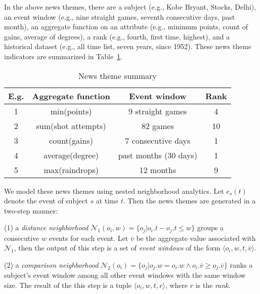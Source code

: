 In the above news themes, there are a subject (e.g., Kobe Bryant, Stocks, Delhi), an event window (e.g., nine straight games, seventh consecutive days, past month), an aggregate function on an attribute
(e.g., minimum points, count of gains, average of degrees), a rank (e.g., fourth, first time, highest), and a
historical dataset (e.g., all time list, seven years, since 1952). These news theme indicators are summarized in Table~\ref{tbl:news-example}.  


\begin{table}[h]
\centering
\begin{tabular}{|c|c|c|c|}
\hline
\textbf{E.g.} & \textbf{Aggregate function} & \textbf{Event window} & \textbf{Rank} \\
\hline
1 & min(points) & 9 straight games & 4 \\
\hline
2 & sum(shot attempts) & 82 games & 10 \\
\hline
3 & count(gains) & 7 consecutive days & 1 \\
\hline
4 & average(degree) & past months (30 days) & 1 \\
\hline
5 & max(raindrops) & 12 months & 9 \\
\hline
\end{tabular}
\caption{News theme summary}
\label{tbl:news-example}
\end{table}


We model these news themes using nested neighborhood analytics. Let $e_s(t)$ denote the event of subject $s$ at time $t$. Then the news themes are generated in a two-step manner: 

(1) a \emph{distance neighborhood} $\mathcal{N}_1(o_i,w)=\{o_j | o_i.t - o_j.t \leq w \}$ groups a consecutive $w$ events for each event. Let $\overline{v}$ be the aggregate value associated with $\mathcal{N}_1$, then the output of this step is a set of \emph{event windows} of the form  $\langle o_i, w, t, \overline{v} \rangle$.

(2) a \emph{comparison neighborhood} $\mathcal{N}_2(o_i) = \{o_j | o_j.w = o_i.w \wedge o_i.\overline{v} \geq o_j.\overline{v} \}$ ranks a subject's event window among all other event windows with the same window size. The result of the this step is a tuple $\langle o_i, w, t, r \rangle$, where $r$ is the \emph{rank}.

